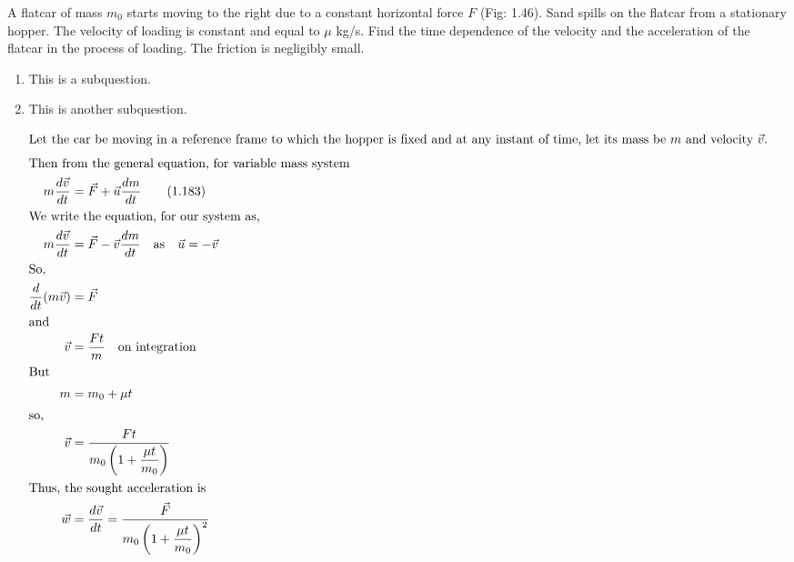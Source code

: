 \item A flatcar of mass \( m_0 \) starts moving to the right due to a constant horizontal force \( F \) (Fig: 1.46). Sand spills on the flatcar from a stationary hopper. The velocity of loading is constant and equal to \( \mu \) kg/s. Find the time dependence of the velocity and the acceleration of the flatcar in the process of loading. The friction is negligibly small.
    \begin{center}
    \end{center}
    \begin{enumerate}
        \item This is a subquestion.
        \item This is another subquestion.
    \end{enumerate}
\begin{solution}
    \begin{center}
    \end{center}

    \begin{align*}
        \intertext{Let the car be moving in a reference frame to which the hopper is fixed and at any instant of time, let its mass be \( m \) and velocity \(\vec{v}\).}
        \intertext{Then from the general equation, for variable mass system}
        m\dfrac{d\vec{v}}{dt} &= \vec{F} + \vec{u} \dfrac{dm}{dt} \tag{1.183}\\
        \intertext{We write the equation, for our system as,}
        m\dfrac{d\vec{v}}{dt} &= \vec{F} - \vec{v} \dfrac{dm}{dt} \quad \text{as} \quad \vec{u} = -\vec{v}\\
        \intertext{So,}
        \dfrac{d}{dt}(m\vec{v}) &= \vec{F}\\
        \intertext{and}
        \vec{v} &= \dfrac{Ft}{m} \quad \text{on integration}\\
        \intertext{But}
        m &= m_0 + \mu t\\
        \intertext{so,}
        \vec{v} &= \dfrac{Ft}{m_0 \left( 1 + \dfrac{\mu t}{m_0} \right)}\\
        \intertext{Thus, the sought acceleration is}
        \vec{w} &= \dfrac{d\vec{v}}{dt} = \dfrac{\vec{F}}{m_0 \left( 1 + \dfrac{\mu t}{m_0} \right)^2}
    \end{align*}
\end{solution}
